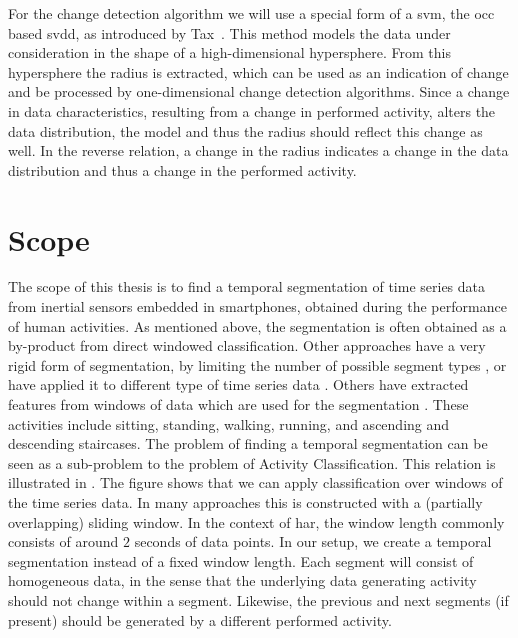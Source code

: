 For the change detection algorithm we will use a special form of a \gls{svm}, the \gls{occ} based \gls{svdd}, as introduced by Tax~\cite{tax2001one}.
This method models the data under consideration in the shape of a high-dimensional hypersphere.
From this hypersphere the radius is extracted, which can be used as an indication of change and be processed by one-dimensional change detection algorithms.
Since a change in data characteristics, resulting from a change in performed activity, alters the data distribution, the model and thus the radius should reflect this change as well.
In the reverse relation, a change in the radius indicates a change in the data distribution and thus a change in the performed activity.

\section{Scope}
The scope of this thesis is to find a temporal segmentation of time series data from inertial sensors embedded in smartphones, obtained during the performance of human activities.
As mentioned above, the segmentation is often obtained as a by-product from direct windowed classification.
Other approaches have a very rigid form of segmentation, \eg by limiting the number of possible segment types \cite{himberg2001time,chamroukhi2013joint}, or have applied it to different type of time series data \cite{li2007segmentation,fuchs2010online,guenterberg2009automatic}.
Others have extracted features from windows of data which are used for the segmentation \cite{guo2012adaptive}.
These activities include sitting, standing, walking, running, and ascending and descending staircases.
The problem of finding a temporal segmentation can be seen as a sub-problem to the problem of Activity Classification.
This relation is illustrated in .
The figure shows that we can apply classification over windows of the time series data.
In many approaches this is constructed with a (partially overlapping) sliding window.
In the context of \gls{har}, the window length commonly consists of around $2$ seconds of data points.
In our setup, we create a temporal segmentation instead of a fixed window length.
Each segment will consist of homogeneous data, in the sense that the underlying data generating activity should not change within a segment.
Likewise, the previous and next segments (if present) should be generated by a different performed activity.

